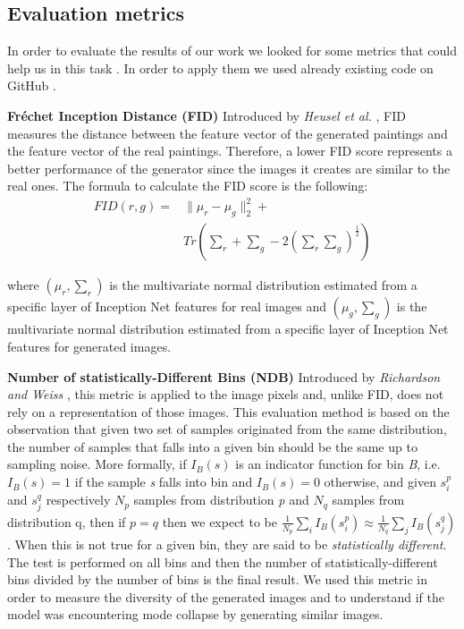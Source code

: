 \documentclass[10pt,twocolumn,letterpaper]{article}
\begin{document}
\subsection{Evaluation metrics}
In order to evaluate the results of our work we looked for some metrics that could help us in this task \cite{metrics}. In order to apply them we used already existing code on GitHub \cite{metricsRepo}.

\textbf{Fréchet Inception Distance (FID)} Introduced by \textit{Heusel et al.} \cite{fid}, FID measures the distance between the feature vector of the generated paintings and the feature vector of the real paintings. Therefore, a lower FID score represents a better performance of the generator since the images it creates are similar to the real ones. The formula to calculate the FID score is the following:
\begin{equation}
	\begin{split}
		\textstyle FID(r, g) = & \| \mu_{r} - \mu_{g} \| _{2}^{2} + \\ 
			& \textstyle Tr(\sum_{r} +  \sum_{g} - 2(\sum_{r}\sum_{g})^\frac{1}{2})
	\end{split}
\end{equation}
 
where $\textstyle (\mu_{r} , \sum_{r})$ is the multivariate normal distribution estimated from a specific layer of Inception Net features for real images and $\textstyle (\mu_{g} , \sum_{g})$ is the multivariate normal distribution estimated from a specific layer of Inception Net features for generated images. 

\textbf{Number of statistically-Different Bins (NDB)} Introduced by \textit{Richardson and Weiss} \cite{ndb}, this metric is applied to the image pixels and, unlike FID, does not rely on a representation of those images. This evaluation method is based on the observation that given two set of samples originated from the same distribution, the number of samples that falls into a given bin should be the same up to sampling noise. More formally, if $I_{B}(s)$ is an indicator function for bin \textit{B}, i.e. $I_{B}(s)=1$ if the sample \textit{s} falls into bin  and $I_{B}(s)=0$ otherwise, and given ${s_{i}^{p}}$ and ${s_{j}^{q}}$ respectively ${N_{p}}$ samples from distribution \textit{p} and ${N_{q}}$ samples from distribution q, then if $p=q$ then we expect to be $\textstyle \frac{1}{N_p}\sum_{i}{I_B(s_{i}^{p})} \approx \frac{1}{N_q}\sum_{j}{I_B(s_{j}^{q})} $. When this is not true for a given bin, they are said to be \textit{statistically different}. The test is performed on all bins and then the number of statistically-different bins divided by the number of bins is the final result. We used this metric in order to measure the diversity of the generated images and to understand if the model was encountering mode collapse by generating similar images. 
\end{document}
